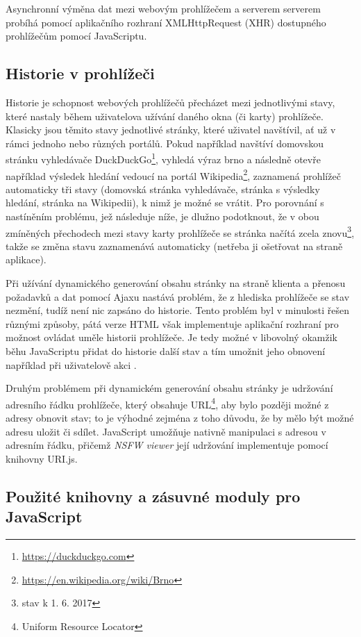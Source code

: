 \documentclass[a4paper, 11pt, oneside]{book}
\newcommand{\simplywn}{\textit{NSFW viewer} }
\newcommand\ex{\textsf}
\begin{document}
					Asynchronní výměna dat mezi webovým prohlížečem a serverem serverem probíhá pomocí aplikačního rozhraní XMLHttpRequest (XHR) dostupného prohlížečům pomocí JavaScriptu. \parencite{mozilla2017XMLHTTP}

				\subsection{Historie v prohlížeči}

					Historie je schopnost webových prohlížečů přecházet mezi jednotlivými stavy, které nastaly během uživatelova užívání daného okna (či karty) prohlížeče. Klasicky jsou těmito stavy jednotlivé stránky, které uživatel navštívil, ať už v rámci jednoho nebo různých portálů. Pokud například navštíví domovskou stránku vyhledávače DuckDuckGo\footnote{\url{https://duckduckgo.com}}, vyhledá výraz \ex{brno} a následně otevře například výsledek hledání vedoucí na portál Wikipedia\footnote{\url{https://en.wikipedia.org/wiki/Brno}}, zaznamená prohlížeč automaticky tři stavy (domovská stránka vyhledávače, stránka s výsledky hledání, stránka na Wikipedii), k nimž je možné se vrátit. Pro porovnání s nastíněním problému, jež následuje níže, je dlužno podotknout, že v obou zmíněných přechodech mezi stavy karty prohlížeče se stránka načítá zcela znovu\footnote{stav k 1. 6. 2017}, takže se změna stavu zaznamenává automaticky (netřeba ji ošetřovat na straně aplikace).

					Při užívání dynamického generování obsahu stránky na straně klienta a přenosu požadavků a dat pomocí Ajaxu nastává problém, že z hlediska prohlížeče se stav nezmění, tudíž není nic zapsáno do historie. Tento problém byl v minulosti řešen různými způsoby, pátá verze HTML však implementuje aplikační rozhraní pro možnost ovládat uměle historii prohlížeče. Je tedy možné v libovolný okamžik běhu JavaScriptu přidat do historie další stav a tím umožnit jeho obnovení například při uživatelově akci .

					Druhým problémem při dynamickém generování obsahu stránky je udržování adresního řádku prohlížeče, který obsahuje URL\footnote{Uniform Resource Locator}, aby bylo později možné z adresy obnovit stav; to je výhodné zejména z toho důvodu, že by mělo být možné adresu uložit či sdílet. JavaScript umožňuje nativně manipulaci s adresou v adresním řádku, přičemž \simplywn její udržování implementuje pomocí knihovny URI.js. \parencite{urijsWeb}

				\subsection{Použité knihovny a zásuvné moduly pro JavaScript}
\end{document}
